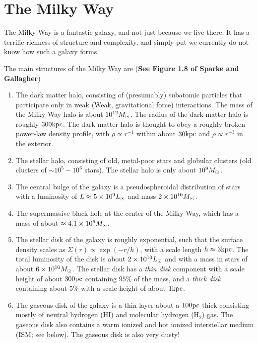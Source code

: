 \documentclass[12pt]{article}
\begin{document}
\section{The Milky Way}

The Milky Way is a fantastic galaxy, and not just because we live there.
It has a terrific richness of structure and complexity, and simply put we
currently do not know how such a galaxy forms.

The main structures of the Milky Way are ({\bf See Figure 1.8 of Sparke and Gallagher})

\begin{enumerate}


\item The dark matter halo, consisting of (presumably) subatomic particles that
participate only in weak (Weak, gravitational force) interactions. The mass of
the Milky Way halo is about $10^{12}M_{\odot}$. The radius of the dark matter halo
is roughly $300\mathrm{kpc}$. The dark matter halo is thought to obey a roughly broken
power-law density profile, with $\rho\propto r^{-1}$ within about $30\mathrm{kpc}$ and
$\rho\propto r^{-3}$ in the exterior.

\item The stellar halo, consisting of old, metal-poor stars and globular clusters
(old clusters of $\sim10^{5}-10^{6}$ stars). The stellar halo is only about
$10^{9}M_{\odot}$.

\item The central bulge of the galaxy is a pseudospheroidal distribution of
stars with a luminosity of $L\approx 5\times 10^{9}L_{\odot}$ 
and mass $2\times10^{10}M_{\odot}$.

\item The supermassive black hole at the center of the Milky Way, which has a
mass of about $\approx4.1\times10^{6}M_{\odot}$.

\item The stellar disk of the galaxy is roughly exponential, such that
the surface density scales as $\Sigma(r) \propto \exp(-r/h)$, 
with a scale length $h\approx3\mathrm{kpc}$. The total luminosity of the disk
is about $2\times10^{10}L_{\odot}$ and with a mass in stars of
about $6\times10^{10}M_{\odot}$. The stellar disk has a {\it thin disk} 
component with
a scale height of about $300\mathrm{pc}$ containing $95\%$ of the mass, and a
{\it thick disk} containing about $5\%$ with a scale height of about $1\mathrm{kpc}$.

\item The gaseous disk of the galaxy is a thin layer about a $100\mathrm{pc}$ thick
consisting mostly of neutral hydrogen (HI) and molecular hydrogen (H$_2$) gas.
The gaseous disk also contains a warm ionized and hot ionized interstellar medium 
(ISM; see below).
The gaseous disk is also very dusty!

\end{enumerate}
\end{document}
